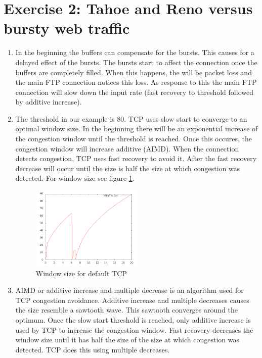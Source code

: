 \documentclass[a4paper,12pt,titlepage]{report}
\begin{document}
\section{Exercise 2: Tahoe and Reno versus bursty web traffic}
\begin{enumerate}
\item
In the beginning the buffers can compensate for the bursts. This causes for a delayed effect of the bursts. The bursts start to affect the connection once the buffers are completely filled. When this happens, the will be packet loss and the main FTP connection notices this loss. As response to this the main FTP connection will slow down the input rate (fast recovery to threshold followed by additive increase).

\item
The threshold in our example is 80. TCP uses slow start to converge to an optimal window size. In the beginning there will be an exponential increase of the congestion window until the threshold is reached. Once this occures, the congestion window will increase additive (AIMD). When the connection detects congestion, TCP uses fast recovery to avoid it. After the fast recovery decrease will occur until the size is half the size at which congestion was detected. For window size see figure \ref{window size}.
\begin{figure}[htb]
\centering
\includegraphics[width=0.5\textwidth]{vraag21.png}
\caption{Window size for default TCP}
\label{window size}
\end{figure}

\item
AIMD or additive increase and multiple decrease is an algorithm used for TCP congestion avoidance. Additive increase and multiple decreases causes the size resemble a sawtooth wave.
This sawtooth converges around the optimum. Once the slow start threshold is reached, only additive increase is used by TCP to increase the congestion window. Fast recovery decreases the window size until it has half the size of the size at which congestion was detected. TCP does this using multiple decreases.


\end{enumerate}
\end{document}
